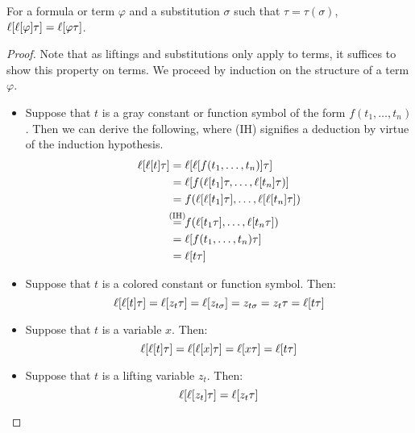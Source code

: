 %
%
\begin{lemma}
	\label{lemma:lifting_tau_commute}
	For a formula or term $\varphi$ and a substitution $\sigma$ such that $\tau = \tau(\sigma)$,
	$\lifboth{\lifboth{ \varphi} \tau} =\nolinebreak \lifboth{ \varphi \tau } $.
\end{lemma}
\begin{proof}
	Note that as liftings and substitutions only apply to terms, it suffices to show this property on terms.
	We proceed by induction on the structure of a term $\varphi$.

	\begin{itemize}
		\item Suppose that $t$ is a gray constant or function symbol of the form $f(t_1, \dots, t_n)$.
			Then we can derive the following, where (IH) signifies a deduction by virtue of the induction hypothesis. 
			\begin{align*}
				\lifboth{\lifboth{t}\tau} &= \lifboth{\lifboth{ f(t_1, \dots, t_n)}\tau} \\
																													&= \lifboth{ f(\lifboth{t_1}\tau, \dots, \lifboth{t_n}\tau) } \\
																											&= f(\lifboth{\lifboth{t_1}\tau}, \dots, \lifboth{\lifboth{t_n}\tau}) \\
																									&\stackrel{\mathclap{\text{(IH)}}}= f(\lifboth{t_1\tau}, \dots, \lifboth{t_n\tau}) \\
																							&= \lifboth{f(t_1, \dots, t_n)\tau} \\
																					 &= \lifboth{t\tau}
			\end{align*}
		\item Suppose that $t$ is a colored constant or function symbol. Then:
			\[
				\ell[\ell[t]\tau]= \ell[z_t\tau] 
				= \ell[z_{t\sigma}] 
				= z_{t\sigma} 
				= z_t\tau
				= \ell[t\tau]
			\]
		\item Suppose that $t$ is a variable $x$. Then:
			\[
				\ell[\ell[t]\tau] = \ell[\ell[ x]\tau] = \ell[x\tau] = \ell[t\tau]
			\]
		\item Suppose that $t$ is a lifting variable $z_t$. Then:
			\[
				\ell[\ell[z_t]\tau] = \ell[z_t\tau] 
				\qedhere
			\]
	\end{itemize}

\end{proof}

